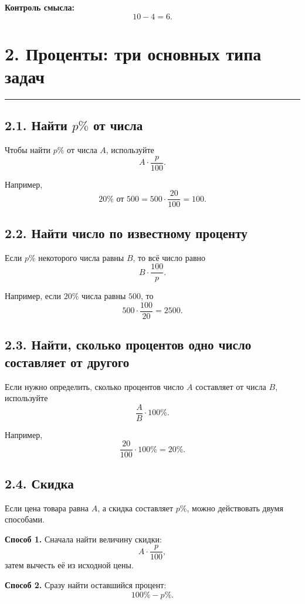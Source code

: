 \documentclass[a4paper,12pt]{article}
\newcommand{\sectionline}{%
    \par\vspace{2mm}
    {\color{accent}\rule{\linewidth}{0.7pt}}
    \vspace{2mm}
}
\begin{document}
\textbf{Контроль смысла:}
\[
    10-4=6.
\]

\section*{\color{darkaccent}2. Проценты: три основных типа задач}
\sectionline

\subsection*{2.1. Найти \(p\%\) от числа}

Чтобы найти \(p\%\) от числа \(A\), используйте
\[
    A\cdot\frac{p}{100}.
\]

Например,
\[
    20\%\text{ от }500
    =
    500\cdot\frac{20}{100}
    =
    100.
\]

\subsection*{2.2. Найти число по известному проценту}

Если \(p\%\) некоторого числа равны \(B\), то всё число равно
\[
    B\cdot\frac{100}{p}.
\]

Например, если \(20\%\) числа равны \(500\), то
\[
    500\cdot\frac{100}{20}
    =
    2500.
\]

\subsection*{2.3. Найти, сколько процентов одно число составляет от другого}

Если нужно определить, сколько процентов число \(A\) составляет от числа \(B\), используйте
\[
    \frac{A}{B}\cdot100\%.
\]

Например,
\[
    \frac{20}{100}\cdot100\%=20\%.
\]

\subsection*{2.4. Скидка}

Если цена товара равна \(A\), а скидка составляет \(p\%\), можно действовать двумя способами.

\textbf{Способ 1.}
Сначала найти величину скидки:
\[
    A\cdot\frac{p}{100},
\]
затем вычесть её из исходной цены.

\textbf{Способ 2.}
Сразу найти оставшийся процент:
\[
    100\%-p\%.
\]
\end{document}
